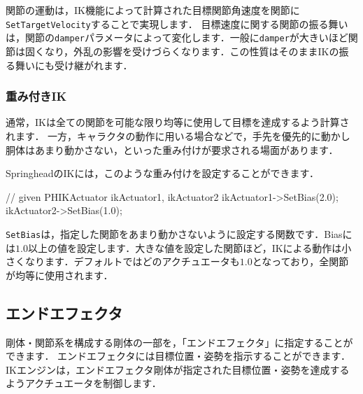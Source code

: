 
\KLUDGE 関節の運動は，IK\KLUDGE 機能によって計算された目標関節角速度を関節に\texttt{SetTargetVelocity}\KLUDGE することで実現します．
\KLUDGE 目標速度に関する関節の振る舞いは，関節の\texttt{damper}\KLUDGE パラメータによって変化します．一般に\texttt{damper}\KLUDGE が大きいほど関節は固くなり，外乱の影響を受けづらくなります．この性質はそのままIK\KLUDGE の振る舞いにも受け継がれます．


\subsubsection*{\KLUDGE 重み付きIK}

\KLUDGE 通常，IK\KLUDGE は全ての関節を可能な限り均等に使用して目標を達成するよう計算されます．
\KLUDGE 一方，キャラクタの動作に用いる場合などで，手先を優先的に動かし胴体はあまり動かさない，といった重み付けが要求される場面があります．

Springhead\KLUDGE のIK\KLUDGE には，このような重み付けを設定することができます．
\begin{sourcecode}
// given PHIKActuator ikActuator1, ikActuator2
ikActuator1->SetBias(2.0);
ikActuator2->SetBias(1.0);
\end{sourcecode}
\texttt{SetBias}\KLUDGE は，指定した関節をあまり動かさないように設定する関数です．Bias\KLUDGE には$1.0$\KLUDGE 以上の値を設定します．大きな値を設定した関節ほど，IK\KLUDGE による動作は小さくなります．デフォルトではどのアクチュエータも$1.0$\KLUDGE となっており，全関節が均等に使用されます．






\subsection*{\KLUDGE エンドエフェクタ}

\KLUDGE 剛体・関節系を構成する剛体の一部を，「エンドエフェクタ」に指定することができます．
\KLUDGE エンドエフェクタには目標位置・姿勢を指示することができます．IK\KLUDGE エンジンは，エンドエフェクタ剛体が指定された目標位置・姿勢を達成するようアクチュエータを制御します．


